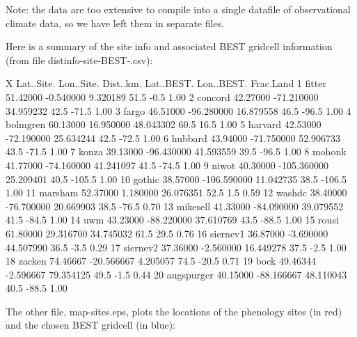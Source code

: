 \documentclass{article}
\begin{document}
Note: the data are too extensive to compile into a single datafile of observational climate data, so we have left them in separate files.

Here is a summary of the site info and associated BEST gridcell information (from file 
distinfo-site-BEST-.csv):


\begin{Schunk}
\begin{Soutput}
            X Lat..Site.  Lon..Site. Dist..km. Lat..BEST. Lon..BEST. Frac.Land
1      fitter   51.42000   -0.540000  9.320189       51.5       -0.5      1.00
2     concord   42.27000  -71.210000 34.959232       42.5      -71.5      1.00
3       fargo   46.51000  -96.280000 16.879558       46.5      -96.5      1.00
4    bolmgren   60.13000   16.950000 48.043302       60.5       16.5      1.00
5     harvard   42.53000  -72.190000 25.634244       42.5      -72.5      1.00
6     hubbard   43.94000  -71.750000 52.906733       43.5      -71.5      1.00
7       konza   39.13000  -96.430000 41.593559       39.5      -96.5      1.00
8      mohonk   41.77000  -74.160000 41.241097       41.5      -74.5      1.00
9       niwot   40.30000 -105.360000 25.209401       40.5     -105.5      1.00
10     gothic   38.57000 -106.590000 11.042735       38.5     -106.5      1.00
11    marsham   52.37000    1.180000 26.076351       52.5        1.5      0.59
12     washdc   38.40000  -76.700000 20.669903       38.5      -76.5      0.70
13   mikesell   41.33000  -84.090000 39.079552       41.5      -84.5      1.00
14        uwm   43.23000  -88.220000 37.610769       43.5      -88.5      1.00
15      rousi   61.80000   29.316700 34.745032       61.5       29.5      0.76
16   siernev1   36.87000   -3.690000 44.507990       36.5       -3.5      0.29
17   siernev2   37.36000   -2.560000 16.449278       37.5       -2.5      1.00
18     zacken   74.46667  -20.566667  4.205057       74.5      -20.5      0.71
19       bock   49.46344   -2.596667 79.354125       49.5       -1.5      0.44
20 augspurger   40.15000  -88.166667 48.110043       40.5      -88.5      1.00
\end{Soutput}
\end{Schunk}


The other file, map-sites.eps, plots the locations of the phenology sites (in red) and the chosen BEST gridcell (in blue):
\end{document}
